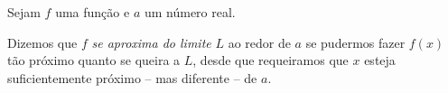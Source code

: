 \begin{definition}
	Sejam $f$ uma função e $a$ um número real.
	
	Dizemos que $f$ \textit{se aproxima do limite} $L$ ao redor de $a$ se pudermos fazer $f(x)$ tão próximo quanto se queira a $L$, desde que requeiramos que $x$ esteja suficientemente próximo -- mas diferente -- de $a$.
\end{definition}